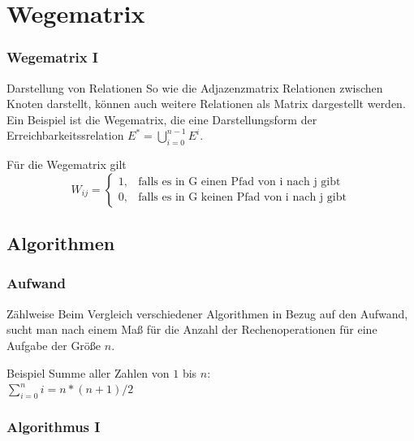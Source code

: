 \section{Wegematrix}
\begin{frame}
	\frametitle{Wegematrix I}
	\begin{block}{Darstellung von Relationen}
		So wie die Adjazenzmatrix Relationen zwischen Knoten darstellt, können auch weitere Relationen als Matrix dargestellt werden. Ein Beispiel ist die Wegematrix, die eine Darstellungsform der Erreichbarkeitssrelation
		$E^*=\bigcup^{n-1}_{i=0} E^i $. \\
	\end{block}
	\begin{block}{Für die Wegematrix gilt}
 \begin{displaymath}
 W_{ij}=
	\begin{cases}
		1, & \text{falls es in G einen Pfad von i nach j gibt} \\
		0, & \text{falls es in G keinen Pfad von i nach j gibt}
	\end{cases}
	\end{displaymath}
	\end{block}
\end{frame}

\subsection{Algorithmen}
\begin{frame}
	\frametitle{Aufwand}
	\begin{block}{Zählweise}
		Beim Vergleich verschiedener Algorithmen in Bezug auf den Aufwand, sucht man nach einem Maß für die Anzahl der Rechenoperationen für eine Aufgabe der Größe $n$.
	\end{block}
	\begin{block}{Beispiel} \pause
		Summe aller Zahlen von $1$ bis $n$: \\

			$\sum^n_{i=0} i = $\pause$n*(n+1)/2$

	\end{block}
\end{frame}

\begin{frame}
	\frametitle{Algorithmus I}



\end{frame}

